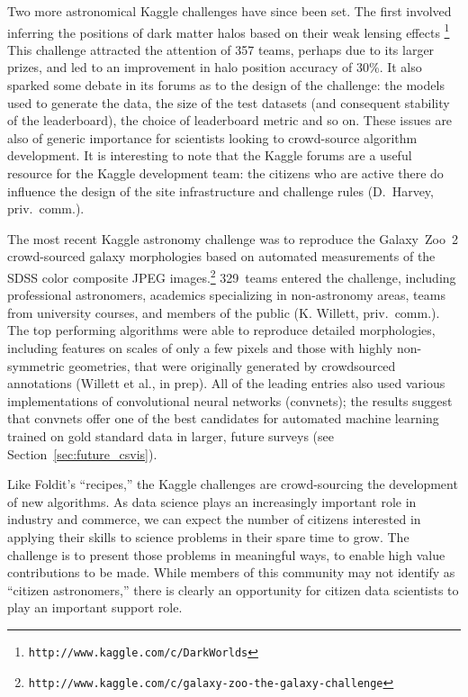\documentclass{ar2e}
\def\Sref#1{Section~\ref{#1}\xspace}
\def\url#1{\texttt{#1}}
\begin{document}
Two more astronomical Kaggle challenges have since been set. The first
involved inferring the positions of dark matter halos based on their weak
lensing effects
\citep{Harvey++2014}\footnote{\url{http://www.kaggle.com/c/DarkWorlds}}  This
challenge attracted the attention of 357 teams, perhaps due to its larger
prizes, and led to an improvement in halo position accuracy of 30\%.  It also
sparked some debate in its forums as to the design of the challenge: the
models used to generate the data, the size of the test datasets (and
consequent stability of the leaderboard),  the choice of leaderboard metric
and so on. These issues are also of generic importance for scientists looking
to crowd-source algorithm development. It is interesting to note that the
Kaggle forums are a useful resource for the Kaggle development team: the
citizens who are active there do influence the design of the site
infrastructure and challenge rules (D.~Harvey, priv.~comm.). 

The most recent
Kaggle astronomy challenge was to reproduce the Galaxy~Zoo~2 crowd-sourced
galaxy morphologies based on automated measurements of the SDSS color composite
JPEG images.\footnote{\url{http://www.kaggle.com/c/galaxy-zoo-the-galaxy-challenge}}
329~teams entered the challenge, including professional astronomers, academics
specializing in non-astronomy areas, teams from university courses, 
and members of the public (K. Willett, priv.\ comm.). 
The top performing algorithms were able to reproduce
detailed morphologies, including features on scales of only a few pixels and
those with highly non-symmetric geometries, that were originally generated
by crowdsourced annotations (Willett et al., in prep).
All of the leading entries also used various implementations of convolutional
neural networks (convnets); the results suggest that convnets offer one of
the best candidates for automated machine learning trained on gold standard
data in larger, future surveys (see \Sref{sec:future_csvis}).



Like Foldit's ``recipes,'' the Kaggle challenges are crowd-sourcing the
development of new algorithms. As data science plays an increasingly important
role in industry and commerce, we can expect the number of citizens interested
in applying their skills to science problems in their spare time to grow. The
challenge is to present those problems in meaningful ways, to enable high value
contributions to be made. While members of this community may not identify as
``citizen astronomers,'' there is clearly an opportunity for citizen data
scientists to play an important support role.
\end{document}
